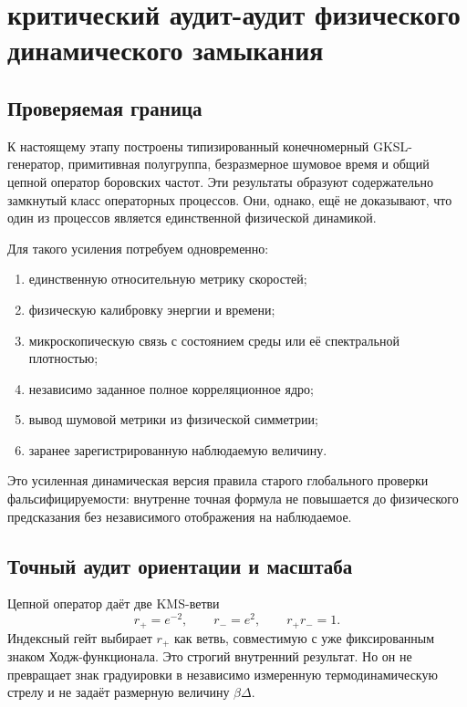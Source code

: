\chapter{критический аудит-аудит физического динамического замыкания}
\label{ch:v8-dynamic-physical-closure-redteam-gate}

\section{Проверяемая граница}

К настоящему этапу построены типизированный конечномерный GKSL-генератор,
примитивная полугруппа, безразмерное шумовое время и общий цепной оператор
боровских частот. Эти результаты образуют содержательно замкнутый класс
операторных процессов. Они, однако, ещё не доказывают, что один из процессов
является единственной физической динамикой.

Для такого усиления потребуем одновременно:
\begin{enumerate}
 \item единственную относительную метрику скоростей;
 \item физическую калибровку энергии и времени;
 \item микроскопическую связь с состоянием среды или её спектральной
 плотностью;
 \item независимо заданное полное корреляционное ядро;
 \item вывод шумовой метрики из физической симметрии;
 \item заранее зарегистрированную наблюдаемую величину.
\end{enumerate}

Это усиленная динамическая версия правила старого глобального
проверки фальсифицируемости: внутренне точная формула не повышается до физического
предсказания без независимого отображения на наблюдаемое.

\section{Точный аудит ориентации и масштаба}

Цепной оператор даёт две KMS-ветви
\begin{equation}
 r_+=e^{-2},\qquad r_-=e^2,\qquad r_+r_-=1.
 \label{eq:v8-redteam-reciprocal-branches}
\end{equation}
Индексный гейт выбирает $r_+$ как ветвь, совместимую с уже фиксированным
знаком Ходж-функционала. Это строгий внутренний результат. Но он не
превращает знак градуировки в независимо измеренную термодинамическую стрелу
и не задаёт размерную величину $\beta\Delta$.

